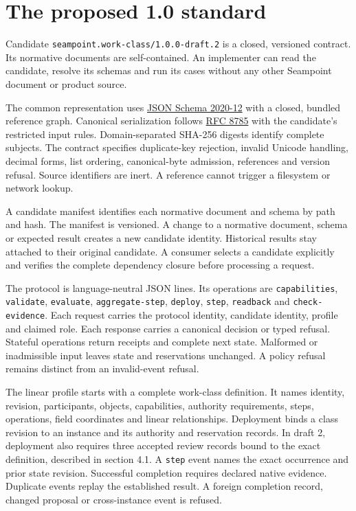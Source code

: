 \documentclass[
  american,
  11pt,
  letterpaper,
]{article}
\newcommand{\passthrough}[1]{#1}
\begin{document}
\section{The proposed 1.0 standard}\label{the-proposed-1.0-standard}

Candidate \passthrough{\lstinline!seampoint.work-class/1.0.0-draft.2!}
is a closed, versioned contract. Its normative documents are
self-contained. An implementer can read the candidate, resolve its
schemas and run its cases without any other Seampoint document or
product source.

The common representation uses
\href{https://json-schema.org/draft/2020-12/json-schema-core.html}{JSON
Schema 2020-12} with a closed, bundled reference graph. Canonical
serialization follows \href{https://www.rfc-editor.org/rfc/rfc8785}{RFC
8785} with the candidate's restricted input rules. Domain-separated
SHA-256 digests identify complete subjects. The contract specifies
duplicate-key rejection, invalid Unicode handling, decimal forms, list
ordering, canonical-byte admission, references and version refusal.
Source identifiers are inert. A reference cannot trigger a filesystem or
network lookup.

A candidate manifest identifies each normative document and schema by
path and hash. The manifest is versioned. A change to a normative
document, schema or expected result creates a new candidate identity.
Historical results stay attached to their original candidate. A consumer
selects a candidate explicitly and verifies the complete dependency
closure before processing a request.

The protocol is language-neutral JSON lines. Its operations are
\passthrough{\lstinline!capabilities!},
\passthrough{\lstinline!validate!}, \passthrough{\lstinline!evaluate!},
\passthrough{\lstinline!aggregate-step!},
\passthrough{\lstinline!deploy!}, \passthrough{\lstinline!step!},
\passthrough{\lstinline!readback!} and
\passthrough{\lstinline!check-evidence!}. Each request carries the
protocol identity, candidate identity, profile and claimed role. Each
response carries a canonical decision or typed refusal. Stateful
operations return receipts and complete next state. Malformed or
inadmissible input leaves state and reservations unchanged. A policy
refusal remains distinct from an invalid-event refusal.

The linear profile starts with a complete work-class definition. It
names identity, revision, participants, objects, capabilities, authority
requirements, steps, operations, field coordinates and linear
relationships. Deployment binds a class revision to an instance and its
authority and reservation records. In draft 2, deployment also requires
three accepted review records bound to the exact definition, described
in section 4.1. A \passthrough{\lstinline!step!} event names the exact
occurrence and prior state revision. Successful completion requires
declared native evidence. Duplicate events replay the established
result. A foreign completion record, changed proposal or cross-instance
event is refused.
\end{document}
